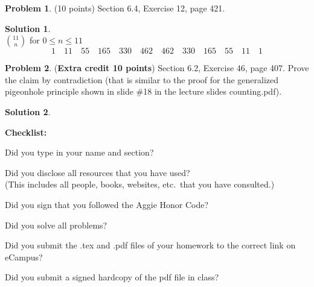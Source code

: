 \documentclass{article}
\theoremstyle{definition}
\newtheorem{problem}{Problem}
\newtheorem*{solution}{Solution}
\newcommand{\checklist}{\noindent\textbf{Checklist:}
\begin{compactitem}[$\Box$] 
\item Did you type in your name and section? 
\item Did you disclose all resources that you have used? \\
(This includes all people, books, websites, etc.\ that you have consulted.)
\item Did you sign that you followed the Aggie Honor Code? 
\item Did you solve all problems? 
\item Did you submit the .tex and .pdf files of your homework to the correct link on eCampus?
\item Did you submit a signed hardcopy of the pdf file in class? 
\end{compactitem}
}
\begin{document}
\begin{problem} (10 points) 
Section 6.4, Exercise 12, page 421.
\end{problem}
\begin{solution}\ \\
$\displaystyle\binom{11}{n}$ for $0 \le n \le 11$
$$1 \quad 11 \quad 55 \quad 165 \quad 330 \quad 462 \quad 462 \quad 330 \quad 165 \quad 55 \quad 11 \quad 1
$$
\end{solution}

\begin{problem} (\textbf{Extra credit 10 points})
Section 6.2, Exercise 46, page 407.  Prove the claim by contradiction 
(that is similar to the proof for the generalized pigeonhole principle shown 
in slide \#18 in the lecture slides counting.pdf).
\end{problem}
\begin{solution} 
\end{solution}

\goodbreak
\checklist
\end{document}
